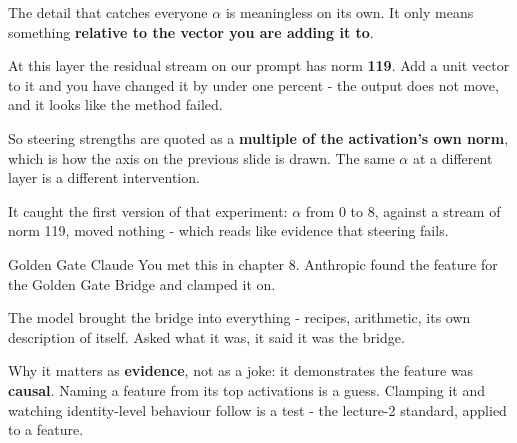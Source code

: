 \documentclass[aspectratio=169]{beamer}
\newcommand{\keybox}[1]{%
  \begin{tcolorbox}[colback=armblue!8, colframe=armblue, boxrule=0.6pt, arc=2pt]
  #1
  \end{tcolorbox}}
\newcommand{\trapbox}[1]{%
  \begin{tcolorbox}[colback=armred!8, colframe=armred, boxrule=0.6pt, arc=2pt]
  #1
  \end{tcolorbox}}
\begin{document}
\begin{frame}{The detail that catches everyone}
  \vspace{0.6em}
  $\alpha$ is meaningless on its own. It only means something \textbf{relative to the vector you
  are adding it to}.

  \vspace{0.7em}
  \trapbox{At this layer the residual stream on our prompt has norm \textbf{119}. Add a unit
  vector to it and you have changed it by under one percent - the output does not move, and it
  looks like the method failed.}

  \vspace{0.7em}
  \keybox{So steering strengths are quoted as a \textbf{multiple of the activation's own norm},
  which is how the axis on the previous slide is drawn. The same $\alpha$ at a different layer is
  a different intervention.}

  \vspace{0.5em}
  {\footnotesize It caught the first version of that experiment: $\alpha$ from 0 to 8, against a
  stream of norm 119, moved nothing - which reads like evidence that steering fails.}
\end{frame}

\begin{frame}{Golden Gate Claude}
  \vspace{0.8em}
  You met this in chapter 8. Anthropic found the feature for the Golden Gate Bridge and clamped
  it on.

  \vspace{0.7em}
  The model brought the bridge into everything - recipes, arithmetic, its own description of
  itself. Asked what it was, it said it was the bridge.

  \vspace{1.0em}
  \keybox{Why it matters as \textbf{evidence}, not as a joke: it demonstrates the feature was
  \textbf{causal}. Naming a feature from its top activations is a guess. Clamping it and watching
  identity-level behaviour follow is a test - the lecture-2 standard, applied to a feature.}
\end{frame}
\end{document}
